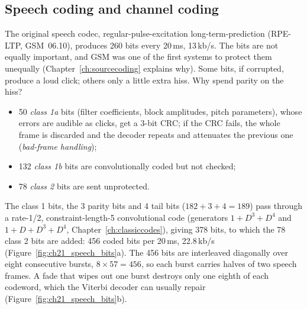 \subsection{Speech coding and channel coding}

The original  speech codec, regular-pulse-excitation long-term-prediction (RPE-LTP,
GSM~06.10), produces 260 bits every 20\,ms, 13\,kb/s. The bits are not equally important, and GSM
was one of the first systems to protect them unequally (Chapter~\ref{ch:sourcecoding} explains why).
Some bits, if corrupted, produce a loud click; others only a little extra hiss. Why spend parity on
the hiss?
\begin{itemize}
\item 50 \emph{class 1a} bits (filter coefficients, block amplitudes, pitch parameters), whose
errors are audible as clicks, get a 3-bit CRC; if the CRC fails, the whole frame is discarded and
the decoder repeats and attenuates the previous one (\emph{bad-frame handling});
\item 132 \emph{class 1b} bits are convolutionally coded but not checked;
\item 78 \emph{class 2} bits are sent unprotected.
\end{itemize}
The class 1 bits, the 3 parity bits and 4 tail bits ($182+3+4=189$) pass through a rate-1/2,
constraint-length-5 convolutional code (generators $1+D^3+D^4$ and $1+D+D^3+D^4$,
Chapter~\ref{ch:classiccodes}), giving 378 bits, to which the 78 class 2 bits are added: 456 coded
bits per 20\,ms, 22.8\,kb/s (Figure~\ref{fig:ch21_speech_bits}a). The 456 bits are interleaved
diagonally over eight consecutive bursts, $8\times57=456$, so each burst carries halves of two
speech frames. A fade that wipes out one burst destroys only one eighth of each codeword, which the
Viterbi decoder can usually repair (Figure~\ref{fig:ch21_speech_bits}b).



